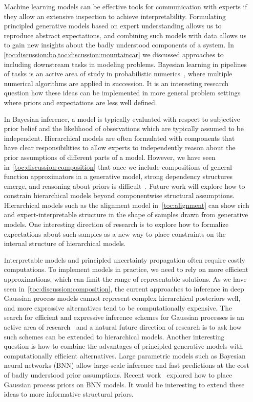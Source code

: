 Machine learning models can be effective tools for communication with experts if they allow an extensive inspection to achieve interpretability.
Formulating principled generative models based on expert understanding allows us to reproduce abstract expectations, and combining such models with data allows us to gain new insights about the badly understood components of a system.
In \cref{toc:discussion:bo,toc:discussion:mountaincar} we discussed approaches to including downstream tasks in modeling problems.
Bayesian learning in pipelines of tasks is an active area of study in probabilistic numerics~\parencite{cockayne_bayesian_2019}, where multiple numerical algorithms are applied in succession.
It is an interesting research question how these ideas can be implemented in more general problem settings where priors and expectations are less well defined.

In Bayesian inference, a model is typically evaluated with respect to subjective prior belief and the likelihood of observations which are typically assumed to be independent.
Hierarchical models are often formulated with components that have clear responsibilities to allow experts to independently reason about the prior assumptions of different parts of a model.
However, we have seen in~\cref{toc:discussion:composition} that once we include compositions of general function approximators in a generative model, strong dependency structures emerge, and reasoning about priors is difficult~\parencite{duvenaud_avoiding_2014}.
Future work will explore how to constrain hierarchical models beyond componentwise structural assumptions.
Hierarchical models such as the alignment model in~\cref{toc:alignment} can show rich and expert-interpretable structure in the shape of samples drawn from generative models.
One interesting direction of research is to explore how to formalize expectations about such samples as a new way to place constraints on the internal structure of hierarchical models.

Interpretable models and principled uncertainty propagation often require costly computations.
To implement models in practice, we need to rely on more efficient approximations, which can limit the range of representable solutions.
As we have seen in~\cref{toc:discussion:composition}, the current approaches to inference in deep Gaussian process models cannot represent complex hierarchical posteriors well, and more expressive alternatives tend to be computationally expensive.
The search for efficient and expressive inference schemes for Gaussian processes is an active area of research~\parencite{salimbeni_orthogonally_2018,shi_sparse_2020,wilson_efficiently_2020} and a natural future direction of research is to ask how such schemes can be extended to hierarchical models.
Another interesting question is how to combine the advantages of principled generative models with computationally efficient alternatives.
Large parametric models such as Bayesian neural networks (BNN) allow large-scale inference and fast predictions at the cost of badly understood prior assumptions.
Recent work~\parencite{sun_functional_2019} explored how to place Gaussian process priors on BNN models.
It would be interesting to extend these ideas to more informative structural priors.
